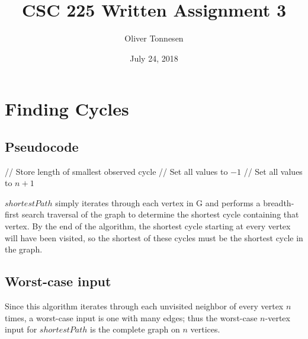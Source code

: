 \documentclass{article}
\title{\vspace{-3.5cm}CSC 225 Written Assignment 3}
\author{Oliver Tonnesen}
\affil{V00885732}
\date{July 24, 2018}
\begin{document}
\maketitle
\renewcommand{\thesubsection}{\thesection.\alph{subsection}}
\section{Finding Cycles}
\subsection{Pseudocode}
\begin{algorithmic}[1]
		 // Store length of smallest observed cycle
			 // Set all values to $-1$
			 // Set all values to $n+1$
					\Else{}
						\EndIf{}
					\EndIf{}
				\EndFor{}
			\EndWhile{}
		\EndFor{}
	\EndFunction{}
\end{algorithmic}

$shortestPath$ simply iterates through each vertex in G and performs a breadth-first search traversal of the graph to determine the shortest cycle containing that vertex. By the end of the algorithm, the shortest cycle starting at every vertex will have been visited, so the shortest of these cycles must be the shortest cycle in the graph.
\subsection{Worst-case input}
Since this algorithm iterates through each unvisited neighbor of every vertex $n$ times, a worst-case input is one with many edges; thus the worst-case $n$-vertex input for $shortestPath$ is the complete graph on $n$ vertices.
\end{document}
